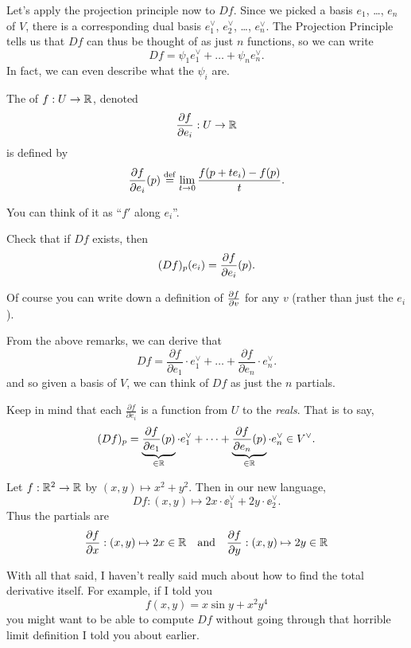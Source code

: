 Let's apply the projection principle now to $Df$.
Since we picked a basis $e_1$, \dots, $e_n$ of $V$,
there is a corresponding dual basis
$e_1^\vee$, $e_2^\vee$, \dots, $e_n^\vee$.
The Projection Principle tells us that $Df$ can thus be thought of as just $n$ functions, so we can write
\[ Df = \psi_1 e_1^\vee + \dots + \psi_n e_n^\vee.  \]
In fact, we can even describe what the $\psi_i$ are.
\begin{definition}
	The  of $f : U \to \mathbb R$, denoted 
	\[ \frac{\partial f}{\partial e_i}: U \to \mathbb R \]
	is defined by
	\[
		\frac{\partial f}{\partial e_i} (p)
		\overset{\mathrm{def}}{=} \lim_{t \to 0} \frac{f(p + te_i) - f(p)}{t}.
	\]
\end{definition}
You can think of it as ``$f'$ along $e_i$''.
\begin{ques}
	Check that if $Df$ exists, then \[ (Df)_p(e_i) = \frac{\partial f}{\partial e_i}(p). \]
\end{ques}
\begin{remark}
	Of course you can write down a definition of $\frac{\partial f}{\partial v}$
	for any $v$ (rather than just the $e_i$).
\end{remark}

From the above remarks, we can derive that
\[
	\boxed{
	Df =
	\frac{\partial f}{\partial e_1} \cdot e_1^\vee
	+ \dots + 
	\frac{\partial f}{\partial e_n} \cdot e_n^\vee .
	}
\]
and so given a basis of $V$, we can think of $Df$ as just
the $n$ partials.
\begin{remark}
Keep in mind that each $\frac{\partial f}{\partial e_i}$ is a function from $U$ to the \emph{reals}.
That is to say,
\[
	(Df)_p =
	\underbrace{\frac{\partial f}{\partial e_1}(p)}_{\in \mathbb R} \cdot e_1^\vee
	+ \dots + 
	\underbrace{\frac{\partial f}{\partial e_n}(p)}_{\in \mathbb R} \cdot e_n^\vee
	\in V^\vee.
\]
\end{remark}


\begin{example}[Partial derivatives of $f(x,y) = x^2+y^2$]
	Let $f : \mathbb R^2 \to \mathbb R$ by $(x,y) \mapsto x^2+y^2$.
	Then in our new language, 
	\[ Df : (x,y) \mapsto 2x \cdot \ee_1^\vee + 2y \cdot \ee_2^\vee. \]
	Thus the partials are
	\[
		\frac{\partial f}{\partial x} : (x,y) \mapsto 2x \in \mathbb R
		\quad\text{and}\quad
		\frac{\partial f}{\partial y} : (x,y) \mapsto 2y \in \mathbb R
	\]
\end{example}

With all that said, I haven't really said much about how to
find the total derivative itself.
For example, if I told you
\[ f(x,y) = x \sin y + x^2y^4 \]
you might want to be able to compute $Df$ without going through
that horrible limit definition I told you about earlier.

